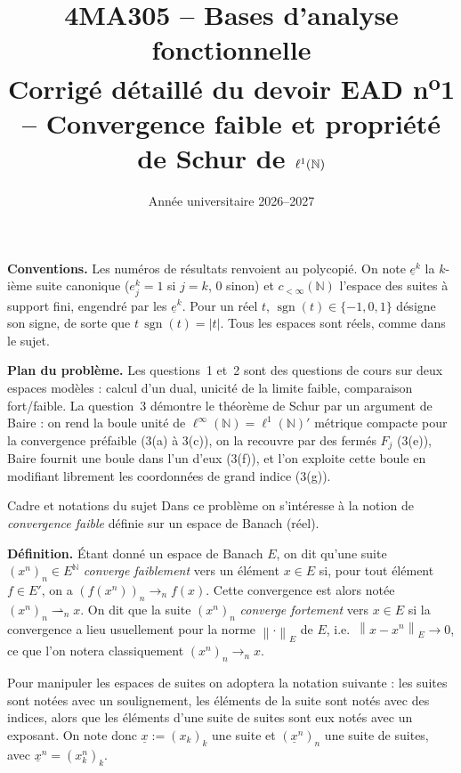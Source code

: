 \documentclass[11pt,a4paper]{article}
\title{\textbf{4MA305 -- Bases d'analyse fonctionnelle}\\[2mm]
\Large Corrigé détaillé du devoir EAD n\textsuperscript{o}1 -- Convergence faible et propriété de Schur de $\ell^1(\N)$}
\author{}
\date{Année universitaire 2026--2027}
\newcommand{\N}{\mathbb{N}}
\newcommand{\norm}[1]{\left\|#1\right\|}
\newcommand{\wk}{\rightharpoonup}
\DeclareMathOperator{\sgn}{sgn}
\theoremstyle{definition}
\newcommand{\su}[1]{\underline{#1}}
\newcommand{\linf}{\ell^\infty(\N)}
\newcommand{\lun}{\ell^1(\N)}
\begin{document}
\maketitle

\begin{commentaire}
\textbf{Conventions.} Les numéros de résultats renvoient au polycopié. On note $\su e^k$ la $k$-ième suite canonique ($e^k_j=1$ si $j=k$, $0$ sinon) et $c_{<\infty}(\N)$ l'espace des suites à support fini, engendré par les $\su e^k$. Pour un réel $t$, $\sgn(t)\in\{-1,0,1\}$ désigne son signe, de sorte que $t\,\sgn(t)=|t|$. Tous les espaces sont réels, comme dans le sujet.

\textbf{Plan du problème.} Les questions~1 et~2 sont des questions de cours sur deux espaces modèles : calcul d'un dual, unicité de la limite faible, comparaison fort/faible. La question~3 démontre le théorème de Schur par un argument de Baire : on rend la boule unité de $\linf=\lun'$ métrique compacte pour la convergence préfaible (3(a) à 3(c)), on la recouvre par des fermés $F_j$ (3(e)), Baire fournit une boule dans l'un d'eux (3(f)), et l'on exploite cette boule en modifiant librement les coordonnées de grand indice (3(g)).
\end{commentaire}

\begin{exo}{Cadre et notations du sujet}
Dans ce problème on s'intéresse à la notion de \emph{convergence faible} définie sur un espace de Banach (réel).

\medskip
\noindent\textbf{Définition.} Étant donné un espace de Banach $E$, on dit qu'une suite $(x^n)_n\in E^\N$ \emph{converge faiblement} vers un élément $x\in E$ si, pour tout élément $f\in E'$, on a $(f(x^n))_n\to_n f(x)$. Cette convergence est alors notée $(x^n)_n\wk_n x$. On dit que la suite $(x^n)_n$ \emph{converge fortement} vers $x\in E$ si la convergence a lieu usuellement pour la norme $\norm\cdot_E$ de $E$, i.e.\ $\norm{x-x^n}_E\to0$, ce que l'on notera classiquement $(x^n)_n\to_n x$.

\medskip
Pour manipuler les espaces de suites on adoptera la notation suivante : les suites sont notées avec un soulignement, les éléments de la suite sont notés avec des indices, alors que les éléments d'une suite de suites sont eux notés avec un exposant. On note donc $\su x:=(x_k)_k$ une suite et $(\su x^n)_n$ une suite de suites, avec $\su x^n=(x^n_k)_k$.
\end{exo}
\end{document}
